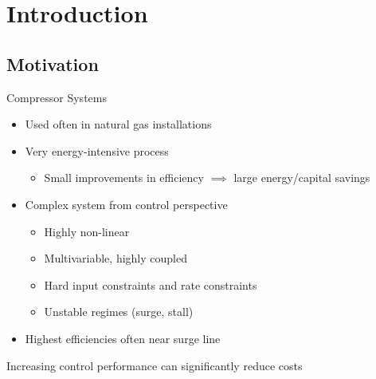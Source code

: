 \section{Introduction}

\subsection{Motivation}
\begin{frame}{Compressor Systems}
  \begin{itemize}
    \item Used often in natural gas installations
    \item Very energy-intensive process
      \begin{itemize}
        \item Small improvements in efficiency $\implies$ large energy/capital savings
      \end{itemize}
    \item Complex system from control perspective
      \begin{itemize}
        \item Highly non-linear
        \item Multivariable, highly coupled
        \item Hard input constraints and rate constraints
        \item Unstable regimes (surge, stall)
      \end{itemize}
    \item Highest efficiencies often near surge line
  \end{itemize}

  \vfill
  \pause
  \alert{\centering Increasing control performance can significantly reduce costs\\}
\end{frame}


